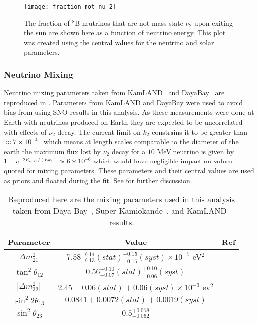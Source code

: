 \begin{figure}
\centering
\texttt{[image: fraction\_not\_nu\_2]}
\caption{
The fraction of $^8$B neutrinos that are not mass state $\nu_2$ upon exiting the sun are shown here as a function of neutrino energy. This plot was created using the central values for the neutrino and solar parameters. 
}
\label{fig:frac_not_nu_2}
\end{figure}

\subsubsection{Neutrino Mixing}
Neutrino mixing parameters taken from KamLAND~\cite{kamland} and DayaBay~\cite{dayabay} are reproduced in . 
Parameters from KamLAND and DayaBay were used to avoid bias from using SNO results in this analysis.
As these measurements were done at Earth with neutrinos produced on Earth they are expected to be uncorrelated with effects of $\nu_2$ decay.
The current limit on $k_2$ constrains it to be greater than $\approx7\times10^{-4}$~\cite{picoreti} which means at length scales comparable to the diameter of the earth the maximum flux lost by $\nu_2$ decay for a $10$ MeV neutrino is given by
$1-e^{-2R_{earth}/(E k_2)} \approx 6\times10^{-6}$
which would have negligible impact on values quoted for mixing parameters.
These parameters and their central values are used as priors and floated during the fit.
See  for further discussion.

\begin{table}
\centering
\begin{tabular}{c|c|c}
Parameter & Value & Ref \\ \hline
$ \Delta m ^2 _{21} $ & $7.58^{+0.14}_{-0.13}(stat)^{+0.15}_{-0.15}(syst) \times 10^{-5}$ eV$^2$ & \cite{kamland} \\ \hline
$ \tan^2 \theta_{12} $ & $0.56^{+0.10}_{-0.07}(stat)^{+0.10}_{-0.06}(syst) $ & \cite{kamland} \\ \hline
$ |\Delta m ^2 _{32}| $ & $2.45\pm0.06(stat)\pm0.06(syst) \times 10^{-3}$ ev$^2$ & \cite{dayabay} \\ \hline
$ \sin^2 2\theta_{13} $ & $0.0841\pm0.0072(stat)\pm0.0019(syst)$ & \cite{dayabay} \\ \hline
$ \sin^2 \theta_{23} $ & $0.5^{+0.058}_{-0.062}$ & \cite{superkth23} \\ 
\end{tabular}
\caption{
\label{tbl:mixing_params}
Reproduced here are the mixing parameters used in this analysis taken from Daya Bay~\cite{dayabay}, Super Kamiokande~\cite{superkth23}, and KamLAND~\cite{kamland} results.
}
\end{table}

